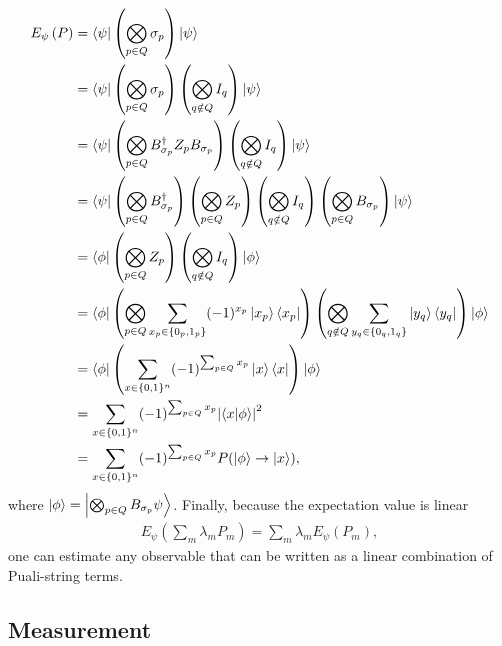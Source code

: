 \documentclass[Dual]{msu-thesis}
\begin{document}
\begin{align}
E_{\psi}\left(P\right)
&=\bra{\psi}\left(\bigotimes_{p\in Q}\sigma_p\right)\ket{\psi} \nonumber \\
&=\bra{\psi}\left(\bigotimes_{p\in Q}\sigma_p\right)
\left(\bigotimes_{q\notin Q}I_q\right)\ket{\psi} \nonumber \\
&=\bra{\psi}\left(\bigotimes_{p \in Q}B_{\sigma_p}^{\dagger}Z_pB_{\sigma_p}\right)
\left(\bigotimes_{q\notin Q}I_q\right)\ket{\psi} \nonumber \\
&=
\bra{\psi}\left(\bigotimes_{p \in Q}B_{\sigma_p}^{\dagger}\right)
\left(\bigotimes_{p \in Q}Z_p\right)
\left(\bigotimes_{q\notin Q}I_q\right)
\left(\bigotimes_{p \in Q}B_{\sigma_p}\right)\ket{\psi} \nonumber 
\\
&=
\bra{\phi}
\left(\bigotimes_{p \in Q}Z_p\right)
\left(\bigotimes_{q\notin Q}I_q\right)
\ket{\phi} \nonumber \\
&=
\bra{\phi}
\left(\bigotimes_{p\in Q}\sum_{x_p\in\{0_p,1_p\}}(-1)^{x_p}\ket{x_p}\bra{x_p}\right)
\left(\bigotimes_{q\notin Q}\sum_{y_q\in\{0_q,1_q\}}\ket{y_q}\bra{y_q}\right)
\ket{\phi} 
\nonumber 
\\
&=
\bra{\phi}
\left(\sum_{x\in\{0,1\}^n}(-1)^{\sum_{p\in Q}x_p}\ket{x}\bra{x}\right)
\ket{\phi} 
\nonumber 
\\
&=
\sum_{x\in\{0,1\}^n}(-1)^{\sum_{p\in Q}x_p}\abs{\bra{x}\ket{\phi}}^2
\nonumber 
\\
&=
\sum_{x\in\{0,1\}^n}(-1)^{\sum_{p\in Q}x_p}P(\ket{\phi}\to\ket{x})
,\end{align}
where $\ket{\phi}=\ket{\bigotimes_{p\in Q}B_{\sigma_p}\psi}$. Finally, because the expectation value is linear
\begin{align}
E_\psi\left(\sum_{m}\lambda_mP_m\right) = \sum_m\lambda_mE_\psi(P_m)
,\end{align}
one can estimate any observable that can be written as a linear combination of Puali-string terms. 

\subsection{Measurement}
\end{document}
